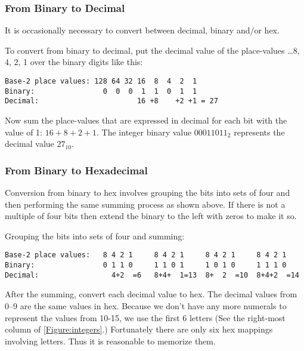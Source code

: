 \subsubsection{From Binary to Decimal}
\label{section:bindec}

It is occasionally necessary to convert between decimal,
binary and/or hex.

To convert from binary to decimal, put the decimal value of the \gls{place-value}s 
{\ldots8, 4, 2, 1} over the binary digits like this:

\begin{verbatim}
Base-2 place values: 128 64 32 16  8  4  2  1
Binary:                0  0  0  1  1  0  1  1
Decimal:                       16 +8    +2 +1 = 27
\end{verbatim}

Now sum the place-values that are expressed in decimal for each 
bit with the value of 1: $16+8+2+1$.  The integer binary value
$00011011_2$ represents the decimal value $27_{10}$.

\subsubsection{From Binary to Hexadecimal}
\label{section:binhex}

Conversion from binary to hex involves grouping the bits into
sets of four and then performing the same summing process as 
shown above.  If there is not a multiple of four bits then
extend the binary to the left with zeros to make it so.

Grouping the bits into sets of four and summing:

\begin{verbatim}
Base-2 place values:   8 4 2 1     8 4 2 1     8 4 2 1     8 4 2 1
Binary:                0 1 1 0     1 1 0 1     1 0 1 0     1 1 1 0
Decimal:                 4+2  =6   8+4+  1=13  8+  2  =10  8+4+2  =14
\end{verbatim}

After the summing, convert each decimal value to hex.  The decimal
values from 0--9 are the same values in hex.  Because we don't have any
more numerals to represent the values from 10-15, we use the first 6
letters (See the right-most column of \autoref{Figure:integers}.)
Fortunately there are only six hex mappings involving letters.  Thus 
it is reasonable to memorize them.

